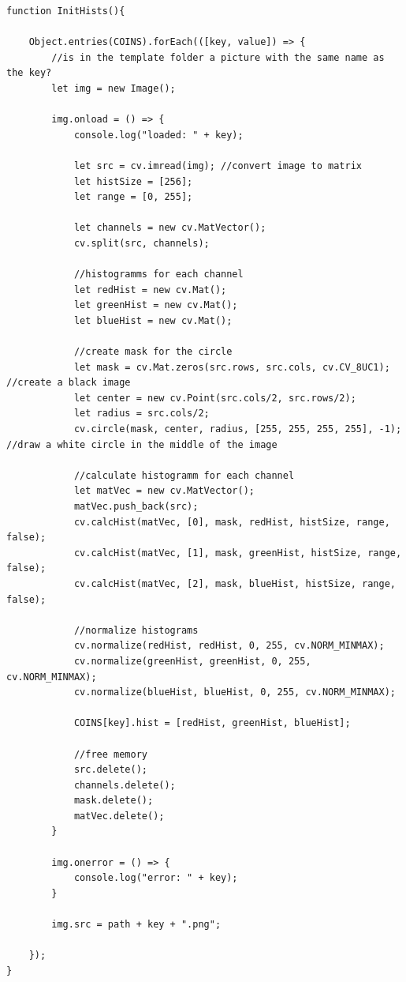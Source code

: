 \begin{lstlisting}[style=JavaScript]
function InitHists(){

    Object.entries(COINS).forEach(([key, value]) => {
        //is in the template folder a picture with the same name as the key?
        let img = new Image();

        img.onload = () => {
            console.log("loaded: " + key);

            let src = cv.imread(img); //convert image to matrix
            let histSize = [256];
            let range = [0, 255];

            let channels = new cv.MatVector();
            cv.split(src, channels);

            //histogramms for each channel
            let redHist = new cv.Mat();
            let greenHist = new cv.Mat();
            let blueHist = new cv.Mat();

            //create mask for the circle
            let mask = cv.Mat.zeros(src.rows, src.cols, cv.CV_8UC1); //create a black image
            let center = new cv.Point(src.cols/2, src.rows/2);
            let radius = src.cols/2;
            cv.circle(mask, center, radius, [255, 255, 255, 255], -1); //draw a white circle in the middle of the image

            //calculate histogramm for each channel
            let matVec = new cv.MatVector();
            matVec.push_back(src);
            cv.calcHist(matVec, [0], mask, redHist, histSize, range, false);
            cv.calcHist(matVec, [1], mask, greenHist, histSize, range, false);
            cv.calcHist(matVec, [2], mask, blueHist, histSize, range, false);

            //normalize histograms
            cv.normalize(redHist, redHist, 0, 255, cv.NORM_MINMAX);
            cv.normalize(greenHist, greenHist, 0, 255, cv.NORM_MINMAX);
            cv.normalize(blueHist, blueHist, 0, 255, cv.NORM_MINMAX);

            COINS[key].hist = [redHist, greenHist, blueHist];

            //free memory
            src.delete();
            channels.delete();
            mask.delete();
            matVec.delete();
        }

        img.onerror = () => {
            console.log("error: " + key);
        }

        img.src = path + key + ".png";

    });
}
\end{lstlisting}

